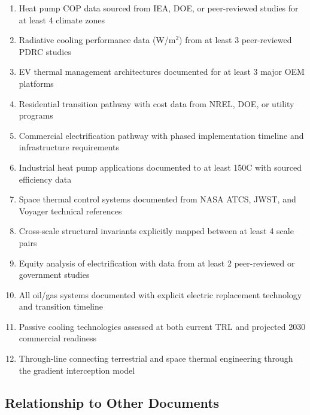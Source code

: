 \documentclass[11pt,letterpaper]{article}
\begin{document}
\begin{enumerate}[leftmargin=2em]
\item Heat pump COP data sourced from IEA, DOE, or peer-reviewed studies for at least 4 climate zones
\item Radiative cooling performance data (W/m$^{2}$) from at least 3 peer-reviewed PDRC studies
\item EV thermal management architectures documented for at least 3 major OEM platforms
\item Residential transition pathway with cost data from NREL, DOE, or utility programs
\item Commercial electrification pathway with phased implementation timeline and infrastructure requirements
\item Industrial heat pump applications documented to at least 150\textdegree C with sourced efficiency data
\item Space thermal control systems documented from NASA ATCS, JWST, and Voyager technical references
\item Cross-scale structural invariants explicitly mapped between at least 4 scale pairs
\item Equity analysis of electrification with data from at least 2 peer-reviewed or government studies
\item All oil/gas systems documented with explicit electric replacement technology and transition timeline
\item Passive cooling technologies assessed at both current TRL and projected 2030 commercial readiness
\item Through-line connecting terrestrial and space thermal engineering through the gradient interception model
\end{enumerate}

\subsection{Relationship to Other Documents}
\end{document}
